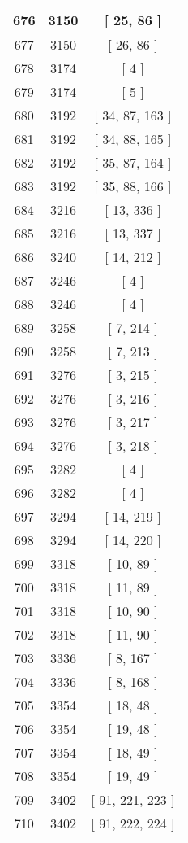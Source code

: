 \begin{center}
\begin{longtable}[H]{|| c c c ||}
\hline
676 & 3150 & [ 25, 86 ] \\ 
\hline
677 & 3150 & [ 26, 86 ] \\ 
\hline
678 & 3174 & [ 4 ] \\ 
\hline
679 & 3174 & [ 5 ] \\ 
\hline
680 & 3192 & [ 34, 87, 163 ] \\ 
\hline
681 & 3192 & [ 34, 88, 165 ] \\ 
\hline
682 & 3192 & [ 35, 87, 164 ] \\ 
\hline
683 & 3192 & [ 35, 88, 166 ] \\ 
\hline
684 & 3216 & [ 13, 336 ] \\ 
\hline
685 & 3216 & [ 13, 337 ] \\ 
\hline
686 & 3240 & [ 14, 212 ] \\ 
\hline
687 & 3246 & [ 4 ] \\ 
\hline
688 & 3246 & [ 4 ] \\ 
\hline
689 & 3258 & [ 7, 214 ] \\ 
\hline
690 & 3258 & [ 7, 213 ] \\ 
\hline
691 & 3276 & [ 3, 215 ] \\ 
\hline
692 & 3276 & [ 3, 216 ] \\ 
\hline
693 & 3276 & [ 3, 217 ] \\ 
\hline
694 & 3276 & [ 3, 218 ] \\ 
\hline
695 & 3282 & [ 4 ] \\ 
\hline
696 & 3282 & [ 4 ] \\ 
\hline
697 & 3294 & [ 14, 219 ] \\ 
\hline
698 & 3294 & [ 14, 220 ] \\ 
\hline
699 & 3318 & [ 10, 89 ] \\ 
\hline
700 & 3318 & [ 11, 89 ] \\ 
\hline
701 & 3318 & [ 10, 90 ] \\ 
\hline
702 & 3318 & [ 11, 90 ] \\ 
\hline
703 & 3336 & [ 8, 167 ] \\ 
\hline
704 & 3336 & [ 8, 168 ] \\ 
\hline
705 & 3354 & [ 18, 48 ] \\ 
\hline
706 & 3354 & [ 19, 48 ] \\ 
\hline
707 & 3354 & [ 18, 49 ] \\ 
\hline
708 & 3354 & [ 19, 49 ] \\ 
\hline
709 & 3402 & [ 91, 221, 223 ] \\ 
\hline
710 & 3402 & [ 91, 222, 224 ] \\ 

\end{longtable}
\end{center}
